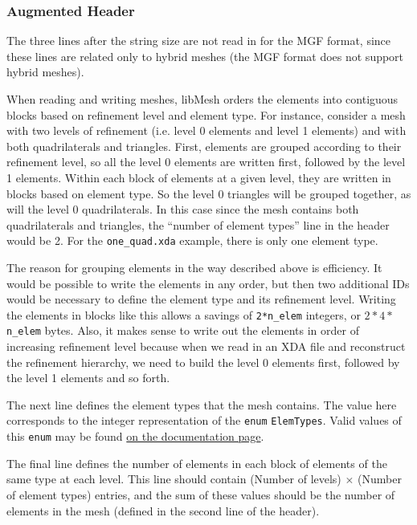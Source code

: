 \documentclass[12pt]{article}
\begin{document}
\subsubsection{Augmented Header}
The three lines after the string size are not read in for the MGF format, since these lines are related only to hybrid meshes (the MGF format does not support hybrid meshes).

When reading and writing meshes, libMesh orders the elements into contiguous blocks based on refinement level and element type.  For instance, consider a mesh with two levels of refinement (i.e. level 0 elements and level 1 elements) and with both quadrilaterals and triangles. First, elements are grouped according to their refinement level, so all the level 0 elements are written first, followed by the level 1 elements. Within each block of elements at a given level, they are written in blocks based on element type. So the level 0 triangles will be grouped together, as will the level 0 quadrilaterals. In this case since the mesh contains both quadrilaterals and triangles, the ``number of element types'' line in the header would be 2.  For the \texttt{one\_quad.xda} example, there is only one element type.

The reason for grouping elements in the way described above is efficiency.  It would be possible to write the elements in any order, but then two additional IDs would be necessary to define the element type and its refinement level.  Writing the elements in blocks like this allows a savings of \texttt{2*n\_elem} integers, or $2*4*$\texttt{n\_elem} bytes. Also, it makes sense to write out the elements in order of increasing refinement level because when we read in an XDA file and reconstruct the refinement hierarchy, we need to build the level 0 elements first, followed by the level 1 elements and so forth.

The next line defines the element types that the mesh contains.  The value here corresponds to the integer representation of the \texttt{enum} \texttt{ElemTypes}.  Valid values of this \texttt{enum} may be found \href{http://libmesh.sourceforge.net/doxygen/namespacelibMeshEnums.html#a145}{on the documentation page}.

The final line defines the number of elements in each block of elements of the same type at each level. This line
should contain (Number of levels) $\times$ (Number of element types) entries, 
and the sum of these values should be the number of elements in the mesh 
(defined in the second line of the header).
\end{document}
